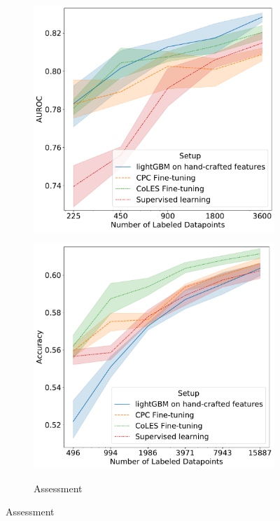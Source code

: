 \documentclass{article}
\begin{document}
\begin{figure}
\begin{subfigure}{0.5\linewidth}
    \includegraphics[width=\linewidth]{figures/ss_rosbank.pdf}
    \label{fig-semi-churn}
  \end{subfigure}
  \begin{subfigure}{0.5\linewidth}
    \caption{Assessment}
    \includegraphics[width=\linewidth]{figures/ss_bowl2019.pdf}
    \label{fig-semi-assessment2}

\end{subfigure}
\end{figure}
\end{document}
